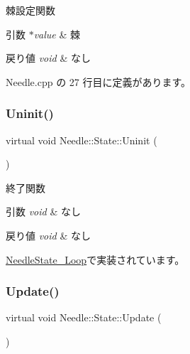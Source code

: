 棘設定関数 


\begin{DoxyParams}{引数}
{\em $\ast$value} & 棘 \\
\hline
\end{DoxyParams}

\begin{DoxyRetVals}{戻り値}
{\em void} & なし \\
\hline
\end{DoxyRetVals}


 Needle.\+cpp の 27 行目に定義があります。

\mbox{\label{class_needle_1_1_state_a8a4795ac9a90c7497ab8d039562691d2}} 
\subsubsection{\texorpdfstring{Uninit()}{Uninit()}}
{\footnotesize\ttfamily virtual void Needle\+::\+State\+::\+Uninit (\begin{DoxyParamCaption}{ }\end{DoxyParamCaption})\hspace{0.3cm}{\ttfamily [pure virtual]}}



終了関数 


\begin{DoxyParams}{引数}
{\em void} & なし \\
\hline
\end{DoxyParams}

\begin{DoxyRetVals}{戻り値}
{\em void} & なし \\
\hline
\end{DoxyRetVals}


\mbox{\hyperlink{class_needle_state___loop_a059c3e62fde73c19292eb2510f4ab8fa}{Needle\+State\+\_\+\+Loop}}で実装されています。

\mbox{\label{class_needle_1_1_state_af1455c890b581081c6135fe091984717}} 
\subsubsection{\texorpdfstring{Update()}{Update()}}
{\footnotesize\ttfamily virtual void Needle\+::\+State\+::\+Update (\begin{DoxyParamCaption}{ }\end{DoxyParamCaption})\hspace{0.3cm}{\ttfamily [pure virtual]}}



